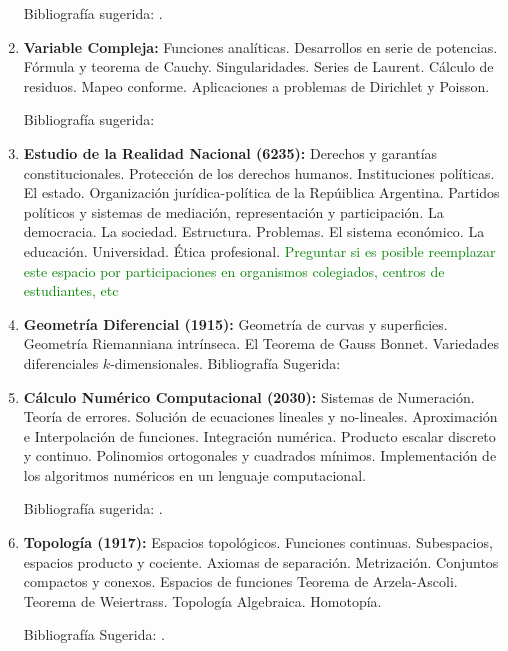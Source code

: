 \documentclass[a4paper, 12pt]{article}
\begin{document}
\begin{enumerate}
Bibliografía sugerida: \cite{roederer, sears}.


\item\textbf{Variable Compleja:}
Funciones analíticas. Desarro\-llos en serie de potencias. Fórmula
y teorema de Cauchy. Singularidades. Series de Laurent. Cálculo de
residuos. Mapeo conforme. Aplicaciones a problemas de Dirichlet y Poisson.

Bibliografía sugerida: \cite{ahlfors, churchill,conway}



\item\textbf{Estudio de la Realidad Nacional (6235):} Derechos y garantías constitucionales. Protección de los derechos humanos. Instituciones políticas.
El estado. Organización jurídica-política de la Repúiblica Argentina. Partidos políticos y sistemas de
mediación, representación y participación. La democracia. La sociedad. Estructura. Problemas. El
sistema económico. La educación. Universidad. Ética profesional.
\textcolor{green}{Preguntar si es posible reemplazar este espacio por participaciones en organismos colegiados, centros de estudiantes, etc}


\item\textbf{Geometría Diferencial (1915):} Geometría de curvas y superficies.
 Geometría Riemanniana
intrínseca. El Teorema de Gauss Bonnet. Variedades diferenciales $k$-dimensionales.
Bibliografía Sugerida: \cite{docarmo,morgan,oneill}




\item\textbf{Cálculo Numérico Computacional (2030):} Sistemas de Numeración.
Teoría de errores. Solución de ecuaciones lineales y no-lineales.
Aproximación e Interpolación de funciones. Integración numérica.
Producto escalar discreto y continuo. Polinomios ortogonales y
cuadrados mínimos. Implementación de los algoritmos numéricos en
un lenguaje computacional.

Bibliografía sugerida: \cite{burden, cheney}.



\item\textbf{Topología (1917):}  Espacios topológicos. Funciones continuas. Subespacios, espacios producto
y cociente. Axiomas de separación. Metrización.
Conjuntos compactos y conexos. Espacios de funciones Teorema de Arzela-Ascoli. Teorema de Weiertrass. 
 Topología Algebraica. Homotopía.

Bibliografía Sugerida: \cite{dugundji, kelley,
munkres, morris1989topology,  JohnMcCleary84,StefanWaldmann87,JohnB.Conway251, RobertAConover507}.


\end{enumerate}
\end{document}
